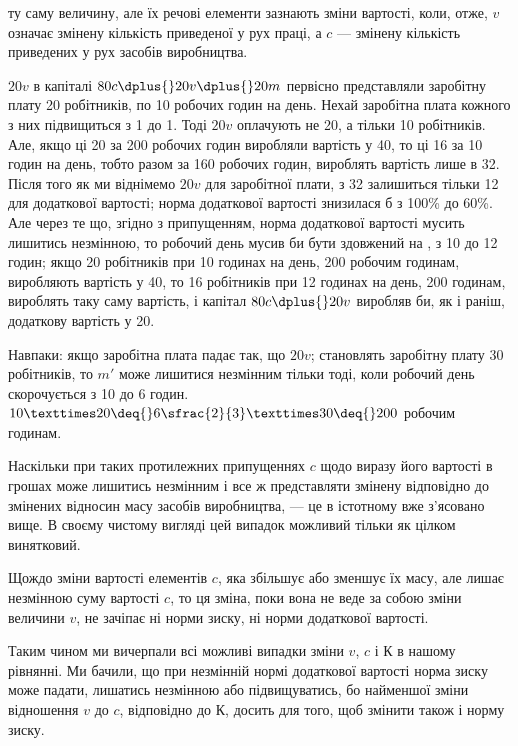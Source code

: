 \baselineskip
\parcont{}  %
ту саму величину, але їх речові елементи зазнають зміни вартості,
коли, отже, $v$ означає змінену кількість приведеної у рух
праці, а $c$ — змінену кількість приведених у рух засобів виробництва.

$20v$ в капіталі $80c \dplus{} 20v \dplus{} 20m$ первісно представляли заробітну
плату 20 робітників, по 10 робочих годин на день. Нехай
заробітна плата кожного з них підвищиться з 1 до 1. Тоді $20v$
оплачують не 20, а тільки 10 робітників. Але, якщо ці 20 за
200 робочих годин виробляли вартість у 40, то ці 16 за 10 годин
на день, тобто разом за 160 робочих годин, вироблять вартість
лише в 32. Після того як ми віднімемо $20v$ для заробітної
плати, з 32 залишиться тільки 12 для додаткової вартості; норма
додаткової вартості знизилася б з 100\% до 60\%. Але через
те що, згідно з припущенням, норма додаткової вартості мусить
лишитись незмінною, то робочий день мусив би бути здовжений
на , з 10 до 12 годин; якщо 20 робітників при 10 годинах
на день, \deq{} 200 робочим годинам, виробляють вартість у 40, то
16 робітників при 12 годинах на день, \deq{} 200 годинам, вироблять
таку саму вартість, і капітал $80c \dplus{} 20v$ виробляв би, як і раніш,
додаткову вартість у 20.

Навпаки: якщо заробітна плата падає так, що $20v$; становлять
заробітну плату 30 робітників, то $m'$ може лишитися
незмінним тільки тоді, коли робочий день скорочується з 10
до 6 годин. $10 × 20 \deq{} 6\sfrac{2}{3} × 30 \deq{} 200$ робочим годинам.

Наскільки при таких протилежних припущеннях $c$ щодо виразу
його вартості в грошах може лишитись незмінним і все ж
представляти змінену відповідно до змінених відносин масу
засобів виробництва, — це в істотному вже з’ясовано вище.
В своєму чистому вигляді цей випадок можливий тільки як цілком
винятковий.

Щождо зміни вартості елементів $c$, яка збільшує або зменшує
їх масу, але лишає незмінною суму вартості $c$, то ця зміна, поки
вона не веде за собою зміни величини $v$, не зачіпає ні норми
зиску, ні норми додаткової вартості.

Таким чином ми вичерпали всі можливі випадки зміни $v$, $c$
і $К$ в нашому рівнянні. Ми бачили, що при незмінній нормі додаткової
вартості норма зиску може падати, лишатись незмінною
або підвищуватись, бо найменшої зміни відношення $v$ до $c$,
відповідно до $К$, досить для того, щоб змінити також і норму
зиску.


